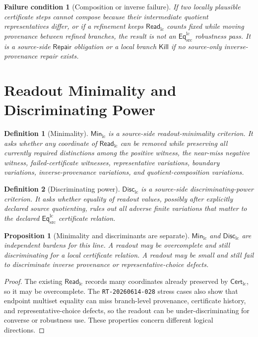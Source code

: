 \documentclass[11pt]{article}
\newcommand{\EqLC}{\mathsf{Eq}_{\mathrm{src}}^{\mathrm{lc}}}
\newcommand{\CertLC}{\mathsf{Cert}_{\mathrm{lc}}}
\newcommand{\ReadLC}{\mathsf{Read}_{\mathrm{lc}}}
\newcommand{\MinLC}{\mathsf{Min}_{\mathrm{lc}}}
\newcommand{\DiscLC}{\mathsf{Disc}_{\mathrm{lc}}}
\newcommand{\Repair}{\mathsf{Repair}}
\newcommand{\Kill}{\mathsf{Kill}}
\newtheorem{definition}{Definition}
\newtheorem{failurecondition}{Failure condition}
\newtheorem{proposition}{Proposition}
\begin{document}
\begin{failurecondition}[Composition or inverse failure]
If two locally plausible certificate steps cannot compose because their
intermediate quotient representatives differ, or if a refinement keeps
\(\ReadLC\) counts fixed while moving provenance between refined
branches, the result is not an \(\EqLC\) robustness pass. It is a
source-side \(\Repair\) obligation or a local branch \(\Kill\) if no
source-only inverse-provenance repair exists.
\end{failurecondition}

\section{Readout Minimality and Discriminating Power}

\begin{definition}[Minimality]
\(\MinLC\) is a source-side readout-minimality criterion. It asks
whether any coordinate of \(\ReadLC\) can be removed while preserving
all currently required distinctions among the positive witness, the
near-miss negative witness, failed-certificate witnesses,
representative variations, boundary variations, inverse-provenance
variations, and quotient-composition variations.
\end{definition}

\begin{definition}[Discriminating power]
\(\DiscLC\) is a source-side discriminating-power criterion. It asks
whether equality of readout values, possibly after explicitly declared
source quotienting, rules out all adverse finite variations that matter
to the declared \(\EqLC\) certificate relation.
\end{definition}

\begin{proposition}[Minimality and discriminants are separate]
\(\MinLC\) and \(\DiscLC\) are independent burdens for this line. A
readout may be overcomplete and still discriminating for a local
certificate relation. A readout may be small and still fail to
discriminate inverse provenance or representative-choice defects.
\end{proposition}

\begin{proof}
The existing \(\ReadLC\) records many coordinates already preserved by
\(\CertLC\), so it may be overcomplete. The \texttt{RT-20260614-028}
stress cases also show that endpoint multiset equality can miss
branch-level provenance, certificate history, and representative-choice
defects, so the readout can be under-discriminating for converse or
robustness use. These properties concern different logical directions.
\end{proof}
\end{document}
